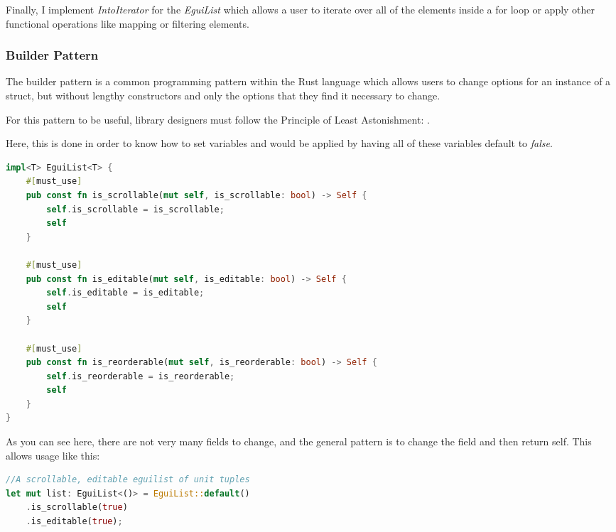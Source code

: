 \documentclass{article}
\begin{document}
\begin{multicols*}{2}
Finally, I implement \textit{IntoIterator} for the \textit{EguiList} which allows a user to iterate over all of the elements inside a for loop or apply other functional operations like mapping or filtering elements.

\subsubsection{Builder Pattern}
The builder pattern is a common programming pattern within the Rust language which allows users to change options for an instance of a struct, but without lengthy constructors and only the options that they find it necessary to change.

For this pattern to be useful, library designers must follow the Principle of Least Astonishment: . \autocite{cowlishawDesignREXXLanguage1984}

Here, this is done in order to know how to set variables and would be applied by having all of these variables default to \textit{false}.

\begin{lstlisting}[language=Rust]
impl<T> EguiList<T> {
	#[must_use]
	pub const fn is_scrollable(mut self, is_scrollable: bool) -> Self {
		self.is_scrollable = is_scrollable;
		self
	}
	
	#[must_use]
	pub const fn is_editable(mut self, is_editable: bool) -> Self {
		self.is_editable = is_editable;
		self
	}
	
	#[must_use]
	pub const fn is_reorderable(mut self, is_reorderable: bool) -> Self {
		self.is_reorderable = is_reorderable;
		self
	}
}
\end{lstlisting}

As you can see here, there are not very many fields to change, and the general pattern is to change the field and then return self. This allows usage like this:

\begin{lstlisting}[language=Rust]
//A scrollable, editable eguilist of unit tuples
let mut list: EguiList<()> = EguiList::default()
	.is_scrollable(true)
	.is_editable(true);
\end{lstlisting}


\end{multicols*}
\end{document}
